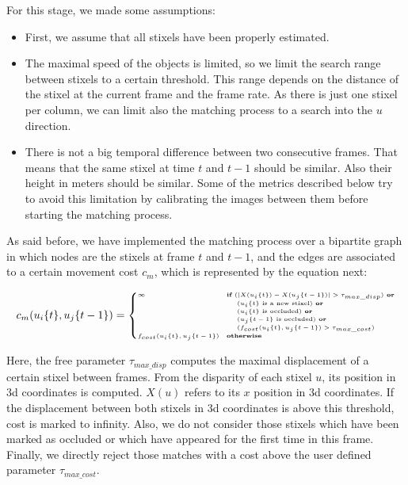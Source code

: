 For this stage, we made some assumptions:
\begin{itemize}
 \item First, we assume that all stixels have been properly estimated.
 \item The maximal speed of the objects is limited, so we limit the search range between stixels to a certain threshold. This range depends on the distance of the stixel at the current frame and the frame rate. As there is just one stixel per column, we can limit also the matching process to a search into the $u$ direction.
 \item There is not a big temporal difference between two consecutive frames. That means that the same stixel at time $t$ and $t - 1$ should be similar. Also their height in meters should be similar. Some of the metrics described below try to avoid this limitation by calibrating the images between them before starting the matching process.
\end{itemize}

As said before, we have implemented the matching process over a bipartite graph in which nodes are the stixels at frame $t$ and $t - 1$, and the edges are associated to a certain movement cost $c_m$, which is represented by the equation next:

\begin{equation}\label{eq:cp04_stixel_movement_cost}
\tiny
  c_m(u_i\{t\}, u_j\{t - 1\}) = 
  \begin{align*}
    \begin{cases}
    \infty & \textbf{if } (|X(u_i\{t\}) - X(u_j\{t - 1\})| > \tau_{max\_disp}) \textbf{ or} \\
    ~ & ~~~~ (u_i\{t\} \text{ is a new stixel}) \textbf{ or} \\
    ~ & ~~~~ (u_i\{t\} \text{ is occluded}) \textbf{ or} \\
    ~ & ~~~~ (u_j\{t - 1\} \text{ is occluded}) \textbf{ or} \\
    ~ & ~~~~ (f_{cost}(u_i\{t\}, u_j\{t - 1\}) > \tau_{max\_cost})   \\
    f_{cost}(u_i\{t\}, u_j\{t - 1\}) & \textbf{otherwise}
    \end{cases}
  \end{align*}
\end{equation}

Here, the free parameter $\tau_{max\_disp}$ computes the maximal displacement of a certain stixel between frames. From the disparity of each stixel $u$, its position in 3d coordinates is computed. $X(u)$ refers to its $x$ position in 3d coordinates. If the displacement between both stixels in 3d coordinates is above this threshold, cost is marked to infinity. Also, we do not consider those stixels which have been marked as occluded or which have appeared for the first time in this frame. Finally, we directly reject those matches with a cost above the user defined parameter $\tau_{max\_cost}$.

